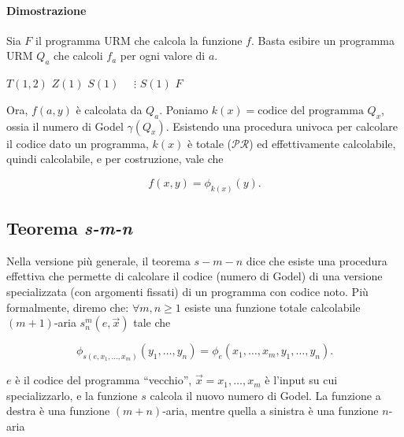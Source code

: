 	\paragraph{Dimostrazione} Sia $F$ il programma URM che calcola la funzione $f$. Basta esibire un programma URM $Q_a$ che calcoli $f_a$ per ogni valore di $a$. 
	
	\begin{algorithm}
		\caption{$Q_a$}
		\begin{algorithmic}
			\State $T(1,2)$
			\State $Z(1)$
			\State $S(1)$
			\State $\quad \vdots$ 
			\State $S(1)$
			\State $F$
		\end{algorithmic}
	\end{algorithm}
	
	Ora, $f(a,y)$ è calcolata da $Q_a$. Poniamo $k(x) = \text{codice del programma } Q_x$, ossia il numero di Godel $\gamma(Q_x)$. Esistendo una procedura univoca per calcolare il codice dato un programma, $k(x)$ è totale ($\mathcal{PR}$) ed effettivamente calcolabile, quindi calcolabile, e per costruzione, vale che
	
	$$
	f(x,y) = \phi_{k(x)}(y).
	$$
	
	\subsection{Teorema \textit{s-m-n }}
	Nella versione più generale, il teorema $s-m-n$ dice che esiste una procedura effettiva che permette di calcolare il codice (numero di Godel) di una versione specializzata (con argomenti fissati) di un programma con codice noto. Più formalmente, diremo che: $\forall m, n \geq 1$ esiste una funzione totale calcolabile $(m+1)$-aria $s^m_n(e, \vec{x})$ tale che
	
	$$
	\phi_{s(e,x_1,\dots,x_m)}(y_1,\dots,y_n)
	=
	\phi_e(x_1,\dots,x_m,y_1,\dots,y_n).
	$$

$e$ è il codice del programma ``vecchio'', $\vec{x} = x_1, \dots, x_m$ è l'input su cui specializzarlo, e la funzione $s$ calcola il nuovo numero di Godel. La funzione a destra è una funzione $(m+n)$-aria, mentre quella a sinistra è una funzione $n$-aria
	